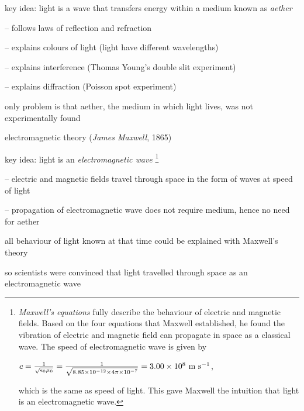key idea: light is a wave that transfers energy within a medium known as \emph{aether}

\begin{compactitem}
	\item[--] follows laws of reflection and refraction
	
	\item[--] explains colours of light (light have different wavelengths)
	
	\item[--] explains interference (Thomas Young's double slit experiment)
	
	\item[--] explains diffraction (Poisson spot experiment)
\end{compactitem}

only problem is that aether, the medium in which light lives, was not experimentally found

\cmt electromagnetic theory (\emph{James Maxwell}, 1865)

key idea: light is an \emph{electromagnetic wave}
\footnote{\emph{Maxwell's equations} fully describe the behaviour of electric and magnetic fields. Based on the four equations that Maxwell established, he found the vibration of electric and magnetic field can propagate in space as a classical wave. The speed of electromagnetic wave is given by
	
	{
		
		\centering
		
		$c=\frac{1}{\sqrt{\epsilon_0\mu_0}}=\frac{1}{\sqrt{8.85\times10^{-12}\times4\pi\times10^{-7}}} = 3.00 \times 10^8 \text{ m s$^{-1}$}$,
		
	}
	
	\noindent which is the same as speed of light. This gave Maxwell the intuition that light is an electromagnetic wave.}

\begin{compactitem}
	\item[--] electric and magnetic fields travel through space in the form of waves at speed of light
	
	\item[--] propagation of electromagnetic wave does not require medium, hence no need for aether
	
\end{compactitem}

all behaviour of light known at that time could be explained with Maxwell's theory

so scientists were convinced that light travelled through space as an electromagnetic wave


